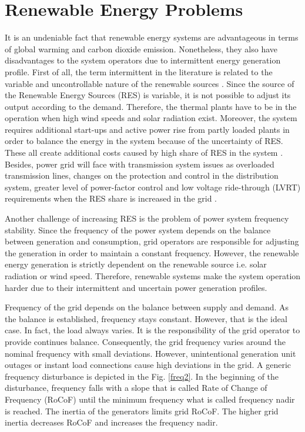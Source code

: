 \section{Renewable Energy Problems}
It is an undeniable fact that renewable energy systems are advantageous in terms of global warming and carbon dioxide emission. Nonetheless, they also have disadvantages to the system operators due to intermittent energy generation profile. First of all, the term intermittent in the literature is related to the variable and uncontrollable nature of the renewable sources \cite{KlingeJacobsen2010}. Since the source of the Renewable Energy Sources (RES) is variable, it is not possible to adjust its output according to the demand. Therefore, the thermal plants have to be in the operation when high wind speeds and solar radiation exist. Moreover, the system requires additional start-ups and active power rise from partly loaded plants in order to balance the energy in the system because of the uncertainty of RES. These all create additional costs caused by high share of RES in the system \cite{Zipf2013}. Besides, power grid will face with transmission system issues as overloaded transmission lines, changes on the protection and control in the distribution system, greater level of power-factor control and low voltage ride-through (LVRT) requirements when the RES share is increased in the grid \cite{Ipakchi2009}.\par
Another challenge of increasing RES is the problem of power system frequency stability. Since the frequency of the power system depends on the balance between generation and consumption, grid operators are responsible for adjusting the generation in order to maintain a constant frequency. However, the renewable energy generation is strictly dependent on the renewable source i.e. solar radiation or wind speed. Therefore, renewable systems make the system operation harder due to their intermittent and uncertain power generation profiles. \par 
Frequency of the grid depends on the balance between supply and demand. As the balance is established, frequency stays constant. However, that is the ideal case. In fact, the load always varies. 
It is the responsibility of the grid operator to provide continues balance. Consequently, the grid frequency varies around the nominal frequency with small deviations. However, unintentional generation unit outages or instant load connections cause high deviations in the grid. A generic frequency disturbance is depicted in the Fig. \ref{freq2}. In the beginning of the disturbance, frequency falls with a slope that is called Rate of Change of Frequency (RoCoF) until the minimum frequency what is called frequency nadir is reached. The inertia of the generators limits grid RoCoF. The higher grid inertia decreases RoCoF and increases the frequency nadir. \par
